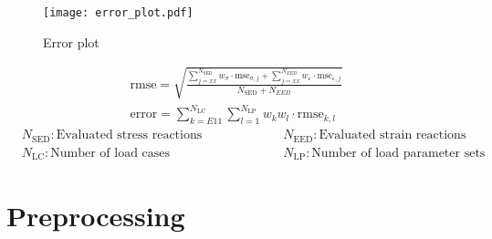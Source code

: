     \begin{figure}[H]
        \centering
        \texttt{[image: error\_plot.pdf]}
        \caption{Error plot}
        \label{fig: erroPlot}
    \end{figure}


    \begin{center}
        \begin{gather}
            \label{eq: rmse}
             \text{rmse} = \sqrt{\frac{\displaystyle\sum_{j=xx}^{N_\text{SED}} w_{\sigma} \cdot \text{mse}_{\sigma,j} + \displaystyle\sum_{j=xx}^{N_{EED}} w_{\varepsilon} \cdot \text{mse}_{\varepsilon,j}}{N_\text{SED} + N_{\scriptscriptstyle EED}}} \\
             \label{eq: error}
            \text{error} = \sum_{k=E11}^{N_\text{LC}} \sum_{l=1}^{N_\text{LP}} w_k w_l \cdot \text{rmse}_{k,l}  
        \end{gather}
        \begin{equation*}
            \begin{split}
                &N_\text{SED}: \text{Evaluated stress reactions}\\
                &N_{\text{LC}}: \text{Number of load cases}
            \end{split}
            \hspace{2cm}
            \begin{split}
                &N_\text{EED}: \text{Evaluated strain reactions}\\
                &N_{\text{LP}}: \text{Number of load parameter sets}
            \end{split}
        \end{equation*}
    \end{center}
    
 
    
    \section{Preprocessing} \label{sec: preprocessing}



